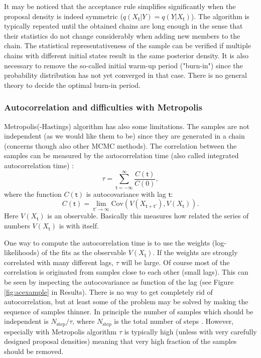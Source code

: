 \documentclass{wihuri}
\def\be{\begin{equation}}
\def\ee{\end{equation}}
\def\tstep{\mathsf{t}}
\begin{document}
It may be noticed that the acceptance rule simplifies significantly when the
proposal density is indeed symmetric ($q(X_{\tstep}|Y) = q(Y|X_{\tstep})$). The algorithm is typically repeated until the obtained chains are long enough in the sense that their statistics do not change considerably when adding new members to the chain. The statistical representativeness of the sample can be verified
if multiple chains with different initial states result in the same posterior density. It is also necessary to remove the so-called initial warm-up period ("burn-in") %
since the probability distribution has not yet converged in that case. %
There is no general theory to decide the optimal burn-in period.%


\subsubsection{Autocorrelation and difficulties with Metropolis}

Metropolis(-Hastings) algorithm has also some limitations. The samples are not independent (as we would like them to be) since they are generated in a chain (concerns though also other MCMC methods). The correlation between the samples can be measured by the autocorrelation time (also called integrated autocorrelation time) \cite{ensemble1}: 
\be \label{eq:autocorr_time}
\tau = \sum_{\tstep=-\infty}^{\infty} \frac{C(\tstep)}{C(0)} ,
\ee
where the function $C(\tstep)$ is autocovariance with lag $\tstep$:
\be \label{eq:autocovariance}
C(\tstep) = \lim_{\tstep'\to\infty}\mathrm{Cov}(V(X_{\tstep+\tstep'}),V(X_{\tstep})).
\ee
Here $V(X_{\tstep})$ is an observable. Basically this measures how related the series of numbers $V(X_{\tstep})$ is with itself. 

One way to compute the autocorrelation time is to use the weights (log-likelihoods) of the fits as the observable $V(X_{\tstep})$. If the weights are strongly correlated with many different lags, $\tau$ will be large. Of course most of the correlation is originated from samples close to each other (small lags). This can be seen by inspecting the autocovariance as function of the lag (see Figure \ref{fig:acexample} in Results). There is no way to get completely rid of autocorrelation, but at least some of the problem may be solved by making the sequence of samples thinner. In principle the number of samples which should be independent is $N_{\mathrm{step}}/\tau$, where $N_{\mathrm{step}}$ is the total number of steps \cite{kaiser}. However, especially with Metropolis algorithm $\tau$ is typically high (unless with very carefully designed proposal densities) meaning that very high fraction of the samples should be removed.
\end{document}
